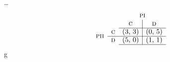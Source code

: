 \dots \pone \ptwo
\begin{equation}
\begin{array}{cc c|c}
                     &            & \multicolumn{2}{c}{\pone} \\
                     &            & \textsc{c} & \textsc{d}   \\ \cline{3-4}
\multirow{2}*{\ptwo} & \textsc{c} & $(3, 3)$   & $(0, 5)$     \\ \cline{2-4}
		     & \textsc{d} & $(5, 0)$   & $(1, 1)$     \\ \cline{3-4}
\end{array}
\label{equ:intro:payoff}
\end{equation}
g







